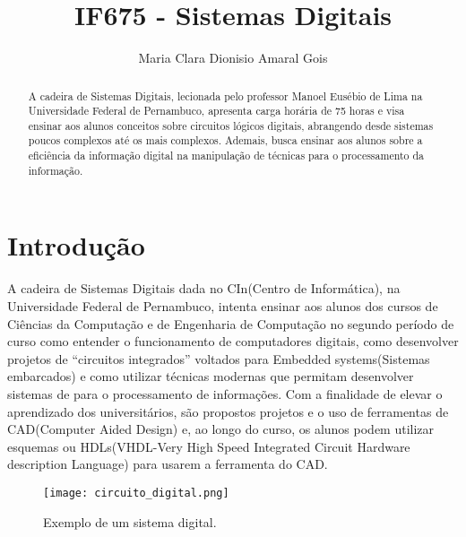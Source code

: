 \documentclass[a4paper]{article}
\title{IF675 - Sistemas Digitais}
\author{Maria Clara Dionisio Amaral Gois}
\begin{document}
\maketitle

\begin{abstract}
A cadeira de Sistemas Digitais, lecionada pelo professor Manoel Eusébio de Lima na Universidade Federal de Pernambuco, apresenta carga horária de 75 horas e visa ensinar aos alunos conceitos sobre circuitos lógicos digitais, abrangendo desde sistemas poucos complexos até os mais complexos. Ademais, busca ensinar aos alunos sobre a eficiência da informação digital na manipulação de técnicas para o processamento da informação.
\end{abstract}

\section*{Introdução}
A cadeira de Sistemas Digitais dada no CIn(Centro de Informática), na Universidade Federal de Pernambuco, intenta ensinar aos alunos dos cursos de Ciências da Computação e de Engenharia de Computação no segundo período de curso como entender o funcionamento de computadores digitais, como desenvolver projetos de “circuitos integrados” voltados para Embedded systems(Sistemas embarcados) e como utilizar técnicas modernas que permitam desenvolver sistemas de para o processamento de informações. Com a finalidade de elevar o aprendizado dos universitários, são propostos projetos e o uso de ferramentas de CAD(Computer Aided Design) e, ao longo do curso, os alunos podem utilizar esquemas ou HDLs(VHDL-Very High Speed Integrated Circuit Hardware description Language) para usarem a ferramenta do CAD.

\begin{figure}[H]
\centering
\texttt{[image: circuito\_digital.png]}
\caption{\label{fig:Circuito} Exemplo de um sistema digital.}
\end{figure}
\end{document}

